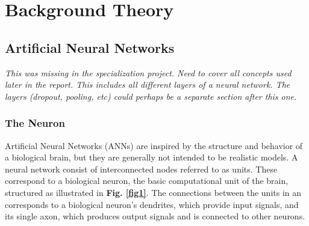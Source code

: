 
\chapter{Background Theory}

\section{Artificial Neural Networks}

\textit{This was missing in the specialization project. Need to cover all concepts used later in the report. This includes all different layers of a neural network. The layers (dropout, pooling, etc) could perhaps be a separate section after this one.}

\subsection{The Neuron}

Artificial Neural Networks (ANNs) are inspired by the structure and behavior of a biological brain, but they are generally not intended to be realistic models. A neural network consist of interconnected nodes referred to as units. These correspond to a biological neuron, the basic computational unit of the brain, structured as illustrated in \textbf{Fig. \ref{fig1}}. The connections between the units in an  corresponds to a biological neuron's dendrites, which provide input signals, and its single axon, which produces output signals and is connected to other neurons. \\


